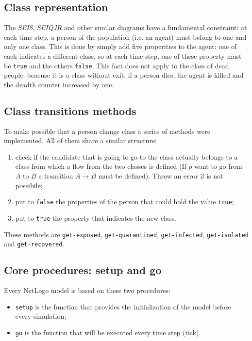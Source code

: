 \documentclass[12pt]{llncs}
\begin{document}
\subsection{Class representation}
The \textit{SEIS}, \textit{SEIQJR} and other similar diagrams have a fundamental constraint: at each time step, a person of the population (i.e. an agent) must belong to one and only one class. This is done by simply add five properities to the agent: one of each indicates a different class, so at each time step, one of these property must be \texttt{true} and the others \texttt{false}. This fact does not apply to the class of dead people, beacuse it is a class without exit: if a person dies, the agent is killed and the deadth counter increased by one.

\subsection{Class transitions methods}
To make possible that a person change class a series of methods were implemented. All of them share a similar structure:
\begin{enumerate}
\item check if the candidate that is going to go to the class actually belongs to a class from which a flow from the two classes is defined (If $p$ want to go from $A$ to $B$ a transition $A \rightarrow B$ must be defined). Throw an error if is not possibile;
\item put to \texttt{false} the properties of the person that could hold the value \texttt{true};
\item put to \texttt{true} the property that indicates the new class.
\end{enumerate}
These methods are \texttt{get-exposed}, \texttt{get-quarantined}, \texttt{get-infected}, \texttt{get-isolated} and \texttt{get-recovered}.

\subsection{Core procedures: setup and go}
Every NetLogo model is based on these two procedures:
\begin{itemize}
\item \texttt{setup} is the function that provides the initialization of the model before every simulation;
\item \texttt{go} is the function that will be executed every time step (tick).
\end{itemize}
\end{document}
